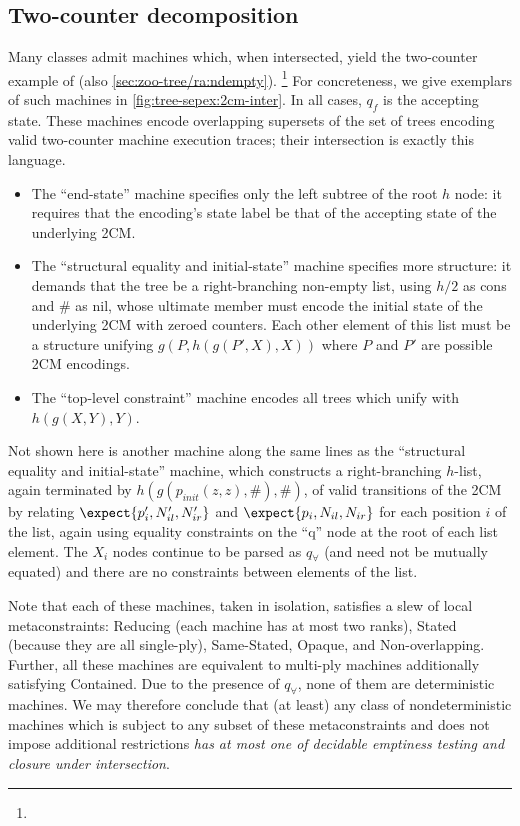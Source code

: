 \subsection{Two-counter decomposition}
\label{sec:tree-sepex:twocm}

Many classes admit machines which, when intersected, yield the two-counter
example of \cite{tata} (also \autoref{sec:zoo-tree/ra:ndempty}).%
%
\footnote{}
%
For concreteness, we give exemplars of such machines in
\autoref{fig:tree-sepex:2cm-inter}.  In all cases, $q_f$ is the accepting
state.  These machines encode overlapping supersets of the set of trees
encoding valid two-counter machine execution traces; their intersection is
exactly this language.
%
\begin{itemize}
%
  \item The ``end-state'' machine specifies only the left subtree of the
root $h$ node: it requires that the encoding's state label be that of the
accepting state of the underlying 2CM.
%
  \item The ``structural equality and initial-state'' machine specifies more
structure: it demands that the tree be a right-branching non-empty list,
using $h/2$ as cons and $\#$ as nil, whose ultimate member must encode the
initial state of the underlying 2CM with zeroed counters.  Each other
element of this list must be a structure unifying $g(P,h(g(P',X),X))$ where
$P$ and $P'$ are possible 2CM encodings.
%
  \item The ``top-level constraint'' machine encodes all trees which unify
with $h(g(X,Y),Y)$.
%
\end{itemize}
%
Not shown here is another machine along the same lines as the ``structural
equality and initial-state'' machine, which constructs a right-branching
$h$-list, again terminated by $h(g(p_{init}(z,z),\#),\#)$, of valid
transitions of the 2CM by relating $\expect{p'_i,N_{il}',N_{ir}'}$ and
$\expect{p_i,N_{il},N_{ir}}$ for each position $i$ of the list, again using
equality constraints on the ``q'' node at the root of each list element.
The $X_i$ nodes continue to be parsed as $q_\forall$ (and need not be
mutually equated) and there are no constraints between elements of the list.

Note that each of these machines, taken in isolation, satisfies a slew of
local metaconstraints: Reducing (each machine has at most two ranks), Stated
(because they are all single-ply), Same-Stated, Opaque, and Non-overlapping.
Further, all these machines are equivalent to multi-ply machines
additionally satisfying Contained.  Due to the presence of $q_\forall$, none
of them are deterministic machines.  We may therefore conclude that (at
least) any class of nondeterministic machines which is subject to any subset
of these metaconstraints and does not impose additional restrictions {\em
has at most one of decidable emptiness testing and closure under
intersection}.

